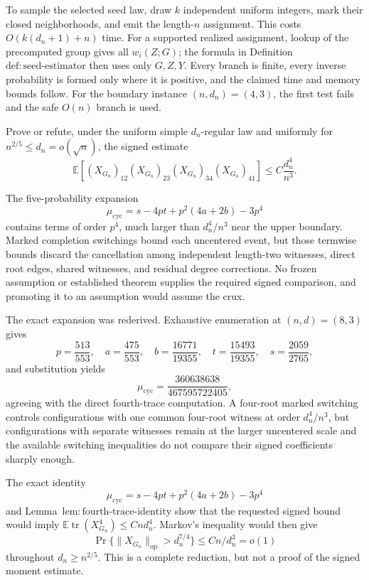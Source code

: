To sample the selected seed law, draw \(k\) independent uniform integers,
mark their closed neighborhoods, and emit the length-\(n\) assignment.
This costs \(O(k(d_n+1)+n)\) time.  For a supported realized assignment,
lookup of the precomputed group gives all \(w_i(Z;G)\); the formula in
Definition~\(\mathrm{def{:}seed\mbox{-}estimator}\) then uses only
\(G,Z,Y\).  Every branch is finite, every inverse probability is formed
only where it is positive, and the claimed time and memory bounds follow.
For the boundary instance \((n,d_n)=(4,3)\), the first test fails and the
safe \(O(n)\) branch is used.

Prove or refute, under the uniform simple \(d_n\)-regular law and uniformly
for \(n^{2/5}\le d_n=o(\sqrt n)\), the signed estimate
\[
\mathbb E[(X_{G_n})_{12}(X_{G_n})_{23}(X_{G_n})_{34}(X_{G_n})_{41}]
\le C\frac{d_n^4}{n^3}.
\]

The five-probability expansion
\[
\mu_{\mathrm{cyc}}=s-4p t+p^2(4a+2b)-3p^4
\]
contains terms of order \(p^4\), much larger than \(d_n^4/n^3\) near the
upper boundary.  Marked completion switchings bound each uncentered event,
but those termwise bounds discard the cancellation among independent
length-two witnesses, direct root edges, shared witnesses, and residual
degree corrections.  No frozen assumption or established theorem supplies
the required signed comparison, and promoting it to an assumption would
assume the crux.

The exact expansion was rederived.  Exhaustive enumeration at \((n,d)=(8,3)\)
gives
\[
p=\frac{513}{553},\quad a=\frac{475}{553},\quad
b=\frac{16771}{19355},\quad t=\frac{15493}{19355},\quad
s=\frac{2059}{2765},
\]
and substitution yields
\[
\mu_{\mathrm{cyc}}=
\frac{360638638}{467595722405},
\]
agreeing with the direct fourth-trace computation.  A four-root marked
switching controls configurations with one common four-root witness at
order \(d_n^4/n^3\), but configurations with separate witnesses remain at
the larger uncentered scale and the available switching inequalities do
not compare their signed coefficients sharply enough.

The exact identity
\[
\mu_{\mathrm{cyc}}=s-4p t+p^2(4a+2b)-3p^4
\]
and Lemma~\(\mathrm{lem{:}fourth\mbox{-}trace\mbox{-}identity}\) show that
the requested signed bound would imply
\(\mathbb E\operatorname{tr}(X_{G_n}^4)\le Cnd_n^4\).  Markov's inequality
would then give
\[
\Pr\{\|X_{G_n}\|_{\mathrm{op}}>d_n^{7/4}\}
\le Cn/d_n^3=o(1)
\]
throughout \(d_n\ge n^{2/5}\).  This is a complete reduction, but not a
proof of the signed moment estimate.

